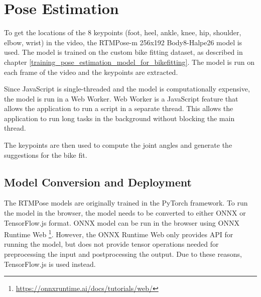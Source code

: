 






\section{Pose Estimation}
\label{pose_estimation}
To get the locations of the 8 keypoints (foot, heel, ankle, knee, hip, shoulder, elbow, wrist) in the video, the RTMPose-m 256x192 Body8-Halpe26 model is used. The model is trained on the custom bike fitting dataset, as described in chapter \ref{training_pose_estimation_model_for_bikefitting}. The model is run on each frame of the video and the keypoints are extracted.

Since JavaScript is single-threaded and the model is computationally expensive, the model is run in a Web Worker. Web Worker is a JavaScript feature that allows the application to run a script in a separate thread. This allows the application to run long tasks in the background without blocking the main thread.

The keypoints are then used to compute the joint angles and generate the suggestions for the bike fit.
\subsection{Model Conversion and Deployment}
The RTMPose models are originally trained in the PyTorch framework. To run the model in the browser, the model needs to be converted to either ONNX or TensorFlow.js format. ONNX model can be run in the browser using ONNX Runtime Web \footnote{\url{https://onnxruntime.ai/docs/tutorials/web/}}. However, the ONNX Runtime Web only provides API for running the model, but does not provide tensor operations needed for preprocessing the input and postprocessing the output. Due to these reasons, TensorFlow.js is used instead.

